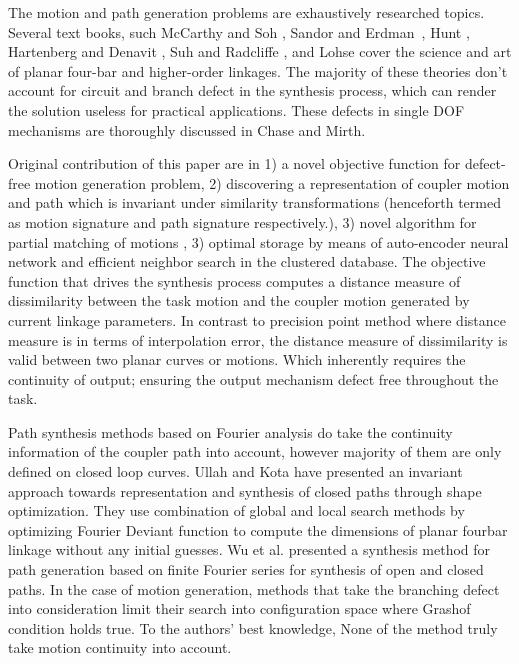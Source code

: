 \documentclass[twocolumn,10pt]{asme2e}
\begin{document}
The motion and path generation problems are exhaustively researched topics.
Several text books, such McCarthy and Soh \cite{sohmccarthy}, Sandor and Erdman~\cite{Sandor}, Hunt \cite{Hunt78}, Hartenberg and Denavit \cite{Hartenberg},  Suh and Radcliffe \cite{Suh78}, and Lohse \cite{lohse2013} cover the science and art of planar four-bar and higher-order linkages.
The majority of these theories don't account for circuit and branch defect in the synthesis process, which can render the solution useless for practical applications.
These defects in single DOF mechanisms are thoroughly discussed in Chase and Mirth\cite{chasemirth}.

Original contribution of this paper are in 1) a novel objective function for defect-free motion generation problem, 2) discovering a representation of coupler motion and path which is invariant under similarity transformations (henceforth termed as motion signature and path signature respectively.), 3) novel algorithm for partial matching of motions , 3) optimal storage by means of auto-encoder neural network and efficient neighbor search in the clustered database.
The objective function that drives the synthesis process computes a distance measure of dissimilarity between the task motion and the coupler motion generated by current linkage parameters.
In contrast to precision point method where distance measure is in terms of interpolation error, the distance measure of dissimilarity is valid between two planar curves or motions.
Which inherently requires the continuity of output; ensuring the output mechanism defect free throughout the task.


Path synthesis methods based on Fourier analysis do take the continuity information of the coupler path into account, however majority of them are only defined on closed loop curves.
Ullah and Kota\cite{ullah1997} have presented an invariant approach towards representation and synthesis of closed paths through shape optimization. They use combination of global and local search methods by optimizing Fourier Deviant function to compute the dimensions of planar fourbar linkage without any initial guesses.
Wu et al.\cite{wu2011} presented a synthesis method for path generation based on finite Fourier series for synthesis of open and closed paths.
In the case of motion generation, methods that take the branching defect into consideration limit their search into configuration space where Grashof condition holds true.
To the authors' best knowledge, None of the method truly take motion continuity into account.
\end{document}
